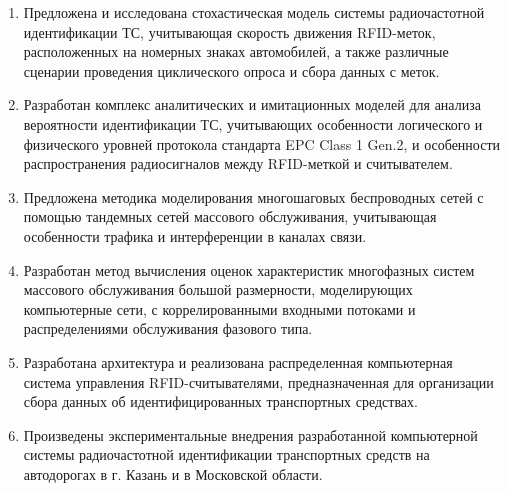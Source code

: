 \begin{enumerate}
  \item Предложена и исследована стохастическая модель системы радиочастотной идентификации ТС, учитывающая скорость движения RFID-меток, расположенных на номерных знаках автомобилей, а также различные сценарии проведения циклического опроса и сбора данных с меток.
  \item Разработан комплекс аналитических и имитационных моделей для анализа вероятности идентификации ТС, учитывающих особенности логического и физического уровней протокола стандарта EPC Class 1 Gen.2, и особенности распространения радиосигналов между RFID-меткой и считывателем.
  \item Предложена методика моделирования многошаговых беспроводных сетей с помощью тандемных сетей массового обслуживания, учитывающая особенности трафика и интерференции в каналах связи.
  \item Разработан метод вычисления оценок характеристик многофазных систем массового обслуживания большой размерности, моделирующих компьютерные сети, с коррелированными входными потоками и распределениями обслуживания фазового типа.
  \item Разработана архитектура и реализована распределенная компьютерная система управления RFID-считывателями, предназначенная для организации сбора данных об идентифицированных транспортных средствах.
  \item Произведены экспериментальные внедрения разработанной компьютерной системы радиочастотной идентификации транспортных средств на автодорогах в г. Казань и в Московской области.


\end{enumerate}
